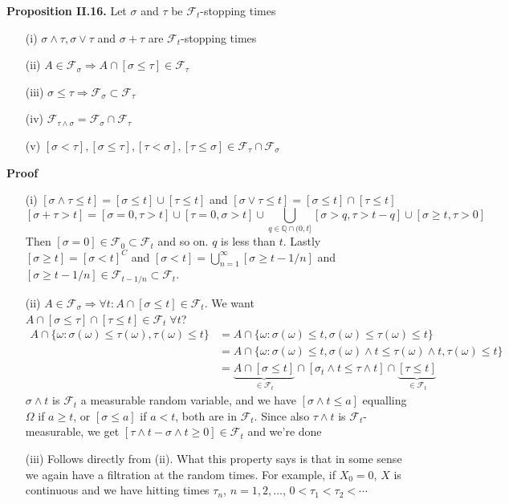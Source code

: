 \documentclass[english]{article}
\newcommand{\ub}{\underbrace}
\newcommand{\note}[1]{\noindent\textbf{#1}}
\newcommand{\F}{\mathcal F}
\begin{document}
\note{Proposition II.16.} Let $\sigma$ and $\tau$ be $\F_t$-stopping times \begin{enumerate}
\item[(i)] $\sigma \wedge \tau, \sigma \vee \tau$ and $\sigma+\tau$ are $\F_t$-stopping times
\item[(ii)] $A \in \F_\sigma \Rightarrow A\cap [\sigma\leq \tau] \in \F_\tau$
\item[(iii)] $\sigma \leq \tau \Rightarrow \F_\sigma \subset \F_\tau$
\item[(iv)] $\F_{\tau \wedge \sigma} = \F_\sigma \cap \F_\tau$
\item[(v)] $[\sigma < \tau], [\sigma \leq \tau], [\tau < \sigma], [\tau \leq \sigma] \in \F_\tau \cap \F_\sigma$
\end{enumerate}
\note{Proof} \begin{enumerate}
\item[(i)] $[\sigma \wedge \tau \leq t] = [\sigma \leq t] \cup [\tau \leq t]$ and $[\sigma \vee \tau \leq t] = [\sigma \leq t] \cap [\tau\leq t]$
$$[\sigma + \tau > t ] = [\sigma = 0, \tau > t] \cup [\tau = 0, \sigma > t] \cup \bigcup_{q \in \mathbb Q\cap (0,t]} [\sigma > q, \tau > t-q] \cup [\sigma \geq t, \tau > 0]$$
Then $[\sigma = 0] \in \F_0 \subset \F_t$ and so on. $q$ is less than $t$. Lastly $[\sigma \geq t] = [\sigma < t ]^C$ and $[\sigma < t] = \bigcup^\infty_{n=1} [\sigma \geq t - 1/n]$ and $[\sigma \geq t- 1/n] \in \F_{t-1/n} \subset \F_t$.
\item[(ii)] $A \in \F_\sigma \Rightarrow \forall t: A\cap [\sigma \leq t] \in \F_t$. We want $A\cap [\sigma \leq \tau] \cap [\tau \leq t] \in \F_t \;\forall t$?
\begin{align*}A\cap \{\omega : \sigma(\omega) \leq \tau(\omega), \tau(\omega) \leq t \} &= A\cap \{\omega: \sigma(\omega) \leq t, \sigma(\omega) \leq \tau(\omega) \leq t\} \\ &= A\cap \{\omega: \sigma(\omega) \leq t, \sigma(\omega)\wedge t \leq \tau(\omega) \wedge t, \tau(\omega) \leq t \}\\ &= \ub{A\cap [\sigma \leq t]}_{\in \F_t} \cap [\sigma_t \wedge t \leq \tau \wedge t] \cap \ub{[\tau \leq t]}_{\in \F_t} \end{align*}
$\sigma\wedge t$ is $\F_t$ a measurable random variable, and we have $[\sigma \wedge t \leq a]$ equalling $\Omega$ if $a\geq t$, or $[\sigma \leq a]$ if $a<t$, both are in $\F_t$. Since also $\tau \wedge t$ is $\F_t$-measurable, we get $[\tau \wedge t - \sigma \wedge t \geq 0] \in \F_t$ and we're done 
\item[(iii)] Follows directly from (ii). What this property says is that in some sense we again have a filtration at the random times. For example, if $X_0 = 0$, $X$ is continuous and we have hitting times $\tau_n$, $n=1,2,\dots$, $0< \tau_1 < \tau_2 < \cdots$

\end{enumerate}
\end{document}
